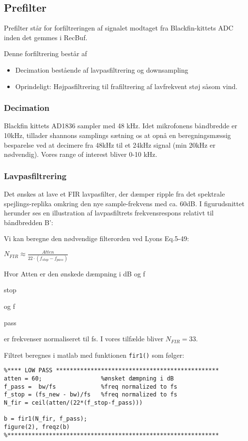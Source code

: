 \subsection*{Prefilter}
Prefilter står for forfiltreringen af signalet modtaget fra Blackfin-kittets ADC inden det gemmes i RecBuf.

Denne forfiltrering består af
\begin{itemize}
	\item Decimation bestående af lavpasfiltrering og downsampling
	\item Oprindeligt: Højpasfiltrering til frafiltrering af lavfrekvent støj såsom vind.
\end{itemize}

\subsubsection{Decimation}
Blackfin kittets AD1836 sampler med 48 kHz. Idet mikrofonens båndbredde er 10kHz, tillader shannons samplings sætning os at opnå en beregningsmæssig besparelse ved at decimere fra 48kHz til et 24kHz signal (min 20kHz er nødvendig).
Vores range of interest bliver 0-10 kHz.

\subsubsection*{Lavpasfiltrering} 
Det ønskes at lave et FIR lavpasfilter, der dæmper ripple fra det spektrale spejlings-replika omkring den nye sample-frekvens med ca. 60dB. 
I figurudsnittet herunder ses en illustration af lavpasfiltrets frekvensrespons relativt til båndbredden B':

Vi kan beregne den nødvendige filterorden ved Lyons Eq.5-49:
\begin{center}
${ N }_{ FIR }\approx \frac { Atten }{ 22\cdot \left( { f }_{ stop }-{ f }_{ pass } \right)  }$
\end{center}
Hvor Atten er den ønskede dæmpning i dB og f\begin{tiny}stop\end{tiny} og f\begin{tiny}pass\end{tiny} er frekvenser normaliseret til fs. I vores tilfælde bliver ${ N }_{ FIR }=33$.

Filtret beregnes i matlab med funktionen \verb+fir1()+ som følger:
\begin{verbatim}%**** LOW PASS ***********************************************
atten = 60;                 %ønsket dæmpning i dB
f_pass =  bw/fs             %freq normalized to fs
f_stop = (fs_new - bw)/fs   %freq normalized to fs
N_fir = ceil(atten/(22*(f_stop-f_pass)))

b = fir1(N_fir, f_pass);
figure(2), freqz(b)
%*************************************************************
\end{verbatim}

